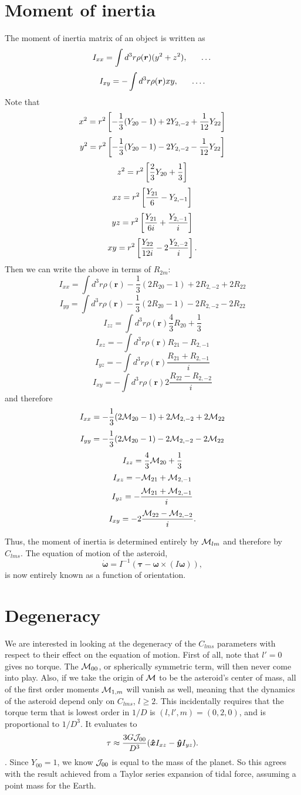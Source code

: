 \documentclass[aps,twocolumn,secnumarabic,balancelastpage,amsmath,amssymb,nofootinbib,floatfix]{revtex4-1}
\begin{document}
\section{Moment of inertia}
The moment of inertia matrix of an object is written as
$$I_{xx}=\int d^3 r \rho(\bm r) (y^2 + z^2), \indent \dots$$
$$I_{xy}=-\int d^3 r \rho(\bm r) xy, \indent \dots.$$
Note that
$$x^2=r^2\left[ -\frac{1}{3}(Y_{20}-1)+2Y_{2,-2}+\frac{1}{12}Y_{22} \right]$$
$$y^2=r^2\left[ -\frac{1}{3}(Y_{20}-1)-2Y_{2,-2}-\frac{1}{12}Y_{22} \right]$$
$$z^2=r^2\left[ \frac{2}{3}Y_{20}+\frac{1}{3} \right]$$
$$xz=r^2\left[ \frac{Y_{21}}{6}-Y_{2,-1} \right]$$
$$yz=r^2\left[ \frac{Y_{21}}{6i}+\frac{Y_{2,-1}}{i} \right]$$
$$xy=r^2\left[ \frac{Y_{22}}{12i}-2\frac{Y_{2,-2}}{i} \right].$$
Then we can write the above in terms of $R_{2m}$:
$$I_{xx}=\int d^3r \rho(\bm r)-\frac{1}{3}(2R_{20}-1)+2R_{2,-2}+2R_{22}$$
$$I_{yy}=\int d^3r \rho(\bm r)-\frac{1}{3}(2R_{20}-1)-2R_{2,-2}-2R_{22}$$
$$I_{zz}=\int d^3r \rho(\bm r)\frac{4}{3}R_{20}+\frac{1}{3}$$
$$I_{xz}=-\int d^3r \rho(\bm r)R_{21}-R_{2,-1}$$
$$I_{yz}=-\int d^3r \rho(\bm r)\frac{R_{21}+R_{2,-1}}{i}$$
$$I_{xy}=-\int d^3r \rho(\bm r)2\frac{R_{22}-R_{2,-2}}{i}$$
and therefore
$$I_{xx}=-\frac{1}{3}(2\mathcal{M}_{20}-1)+2\mathcal{M}_{2,-2}+2\mathcal{M}_{22}$$
$$I_{yy}=-\frac{1}{3}(2\mathcal{M}_{20}-1)-2\mathcal{M}_{2,-2}-2\mathcal{M}_{22}$$
$$I_{zz}=\frac{4}{3}\mathcal{M}_{20}+\frac{1}{3}$$
$$I_{xz}=-\mathcal{M}_{21}+\mathcal{M}_{2,-1}$$
$$I_{yz}=-\frac{\mathcal{M}_{21}+\mathcal{M}_{2,-1}}{i}$$
$$I_{xy}=-2\frac{\mathcal{M}_{22}-\mathcal{M}_{2,-2}}{i}.$$

Thus, the moment of inertia is determined entirely by $\mathcal{M}_{lm}$ and therefore by $C_{lms}$. The equation of motion of the asteroid,
$$\dot{\bm \omega} = I^{-1}(\bm \tau - \bm\omega \times (I \bm\omega)),$$
is now entirely known as a function of orientation.



\section{Degeneracy}
We are interested in looking at the degeneracy of the $C_{lms}$ parameters with respect to their effect on the equation of motion. First of all, note that $l'=0$ gives no torque. The $\mathcal{M}_{00}$, or spherically symmetric term, will then never come into play. Also, if we take the origin of $\mathcal{M}$ to be the asteroid's center of mass, all of the first order moments $\mathcal{M}_{1,m}$ will vanish as well, meaning that the dynamics of the asteroid depend only on $C_{lms}$, $l\geq 2$. This incidentally requires that the torque term that is lowest order in $1/D$ is $(l,l',m)=(0,2,0)$, and is proportional to $1/D^3.$ It evaluates to
$$\tau \approx \frac{3G\mathcal{J}_{00}}{D^3}(\bm{\hat x} I_{xz}-\bm{\hat y} I_{yz}).$$
. Since $Y_{00}=1$, we know $\mathcal{J}_{00}$ is equal to the mass of the planet. So this agrees with the result achieved from a Taylor series expansion of tidal force, assuming a point mass for the Earth.
\end{document}

